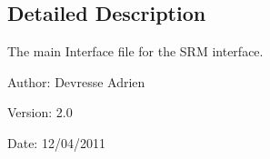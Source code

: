 \subsection{Detailed Description}
The main Interface file for the SRM interface. 

\begin{Desc}
\item[Author:]Devresse Adrien \end{Desc}
\begin{Desc}
\item[Version:]2.0 \end{Desc}
\begin{Desc}
\item[Date:]12/04/2011 \end{Desc}
